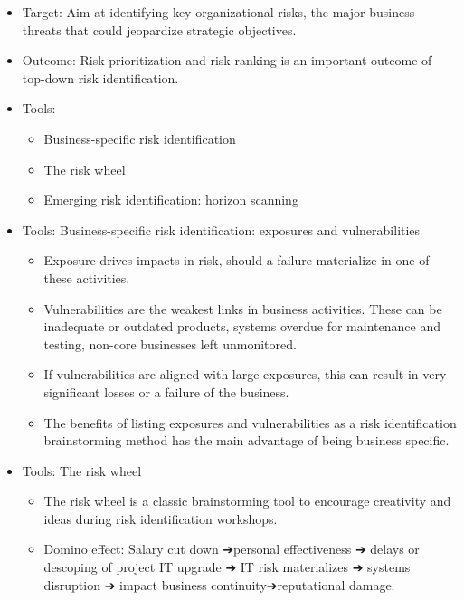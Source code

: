 \begin{itemize}
\item Target: Aim at identifying key organizational risks, the major business threats that could jeopardize strategic objectives.
\item Outcome: Risk prioritization and risk ranking is an important outcome of top-down risk identification.
\item  Tools:
    \begin{itemize}
    \item Business-specific risk identification
    \item The risk wheel
    \item Emerging risk identification: horizon scanning   
    \end{itemize}
\item  Tools: Business-specific risk identification: exposures and vulnerabilities
    \begin{itemize}
    \item Exposure drives impacts in risk, should a failure materialize in one of these activities.
    \item  Vulnerabilities are the weakest links in business activities. These can be inadequate or outdated products, systems overdue for maintenance and testing, non-core businesses left unmonitored.
    \item If vulnerabilities are aligned with large exposures, this can result in very significant losses or a failure of the business.
    \item  The benefits of listing exposures and vulnerabilities as a risk identification brainstorming method has the main advantage of being business specific.
    \end{itemize}
\item Tools: The risk wheel
    \begin{itemize}
    \item The risk wheel is a classic brainstorming tool to encourage creativity and ideas during risk identification workshops.
    \item  Domino effect: Salary cut down ➔personal effectiveness ➔ delays or descoping of project IT upgrade ➔ IT risk materializes ➔ systems disruption ➔ impact business continuity➔reputational damage.
    \end{itemize}


\end{itemize}
